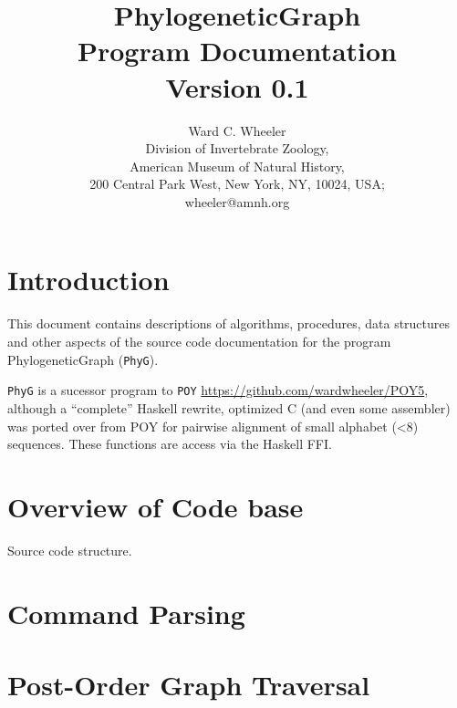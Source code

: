 \documentclass[11pt]{article}
\begin{document}
	
	\title{PhylogeneticGraph\\Program Documentation\\Version 0.1}
	\author{Ward C. Wheeler\\
		Division of Invertebrate Zoology,\\ American Museum of Natural History,\\ 200 Central Park West, New York, NY, 10024, USA;\\wheeler@amnh.org}
	
	
	\maketitle
	\newpage
	
	\tableofcontents
	\newpage
	\section{Introduction}
	This document contains descriptions of algorithms, procedures, data structures and other aspects of the 
	source code documentation for the program PhylogeneticGraph (\texttt{PhyG}).  
	
	 \texttt{PhyG} is a sucessor program to \texttt{POY} \citep{POY2,POY3,POY4,Varonetal2010,POY5, Wheeleretal2015} \url{https://github.com/wardwheeler/POY5}, 
	 although a ``complete'' Haskell rewrite, optimized C (and even some assembler) was ported over from POY for pairwise alignment of small alphabet (<8)
	 sequences.  These functions are access via the Haskell FFI.
	
	
	
	\section{Overview of Code base}
	Source code structure.
	
	
		
	\section {Command Parsing}
	
	\section{Post-Order Graph Traversal}
\end{document}
